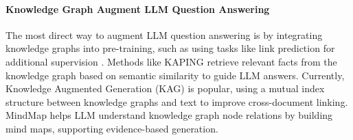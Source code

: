 \paragraph{Knowledge Graph Augment LLM Question Answering} 
The most direct way to augment LLM question answering is by integrating knowledge graphs into pre-training, such as using tasks like link prediction for additional supervision \cite{yasunaga2022deep}. Methods like KAPING \cite{baek-etal-2023-knowledge} retrieve relevant facts from the knowledge graph based on semantic similarity to guide LLM answers. Currently, Knowledge Augmented Generation (KAG) \cite{liang2024kag} is popular, using a mutual index structure between knowledge graphs and text to improve cross-document linking. MindMap \cite{wen-etal-2024-mindmap} helps LLM understand knowledge graph node relations by building mind maps, supporting evidence-based generation.

%